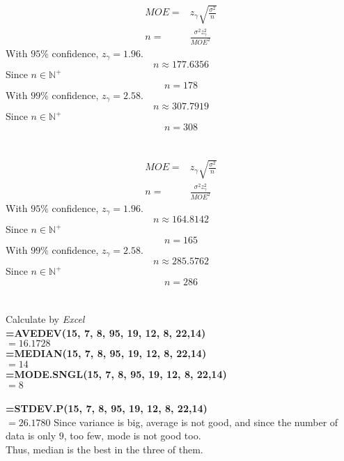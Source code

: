 \documentclass{article}
\begin{document}
    \section{}
        \paragraph{}
        \begin{equation*}
            \begin{split}
                MOE=&z_\gamma\sqrt{\frac{\sigma^2}{n}}\\
                n=&\frac{\sigma^2z_\gamma^2}{MOE^2}
            \end{split}
        \end{equation*}
        With $95\%$ confidence, $z_\gamma=1.96$.
        $$n\approx 177.6356$$
        Since $n\in \mathbb{N}^+$
        $$n=178$$
        With $99\%$ confidence, $z_\gamma=2.58$.
        $$n\approx 307.7919$$
        Since $n\in \mathbb{N}^+$
        $$n=308$$
    \section{}
        \paragraph{}
        \begin{equation*}
            \begin{split}
                MOE=&z_\gamma\sqrt{\frac{\sigma^2}{n}}\\
                n=&\frac{\sigma^2z_\gamma^2}{MOE^2}
            \end{split}
        \end{equation*}
        With $95\%$ confidence, $z_\gamma=1.96$.
        $$n\approx 164.8142$$
        Since $n\in \mathbb{N}^+$
        $$n=165$$
        With $99\%$ confidence, $z_\gamma=2.58$.
        $$n\approx 285.5762$$
        Since $n\in \mathbb{N}^+$
        $$n=286$$
    \section{}
        \paragraph{}
        Calculate by \textit{Excel}\\
        \textbf{=AVEDEV(15, 7, 8, 95, 19, 12, 8, 22,14)} \\$=16.1728$\\
        \textbf{=MEDIAN(15, 7, 8, 95, 19, 12, 8, 22,14)}\\ $=14$\\
        \textbf{=MODE.SNGL(15, 7, 8, 95, 19, 12, 8, 22,14)}\\ $=8$\\
        \\
        \textbf{=STDEV.P(15, 7, 8, 95, 19, 12, 8, 22,14)}\\$=26.1780$
        Since variance is big, average is not good, and since the number of data is only $9$, too few, mode is not good too.
        \\
        Thus, median is the best in the three of them.
\end{document}
